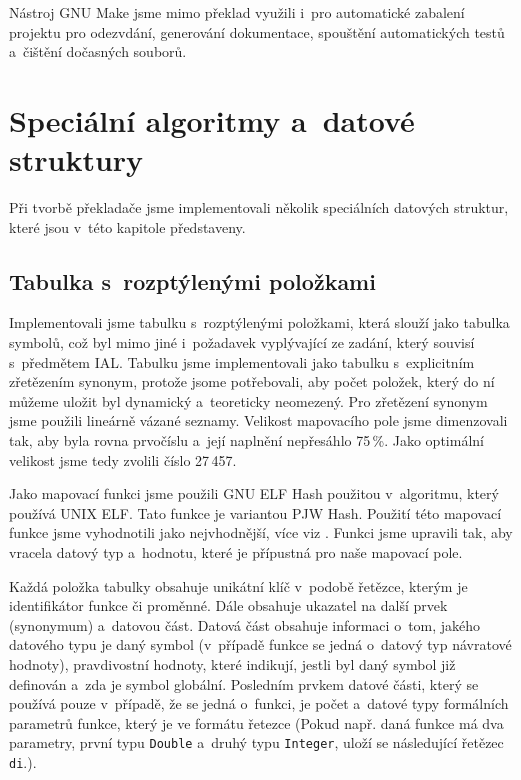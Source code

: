 \documentclass[a4paper, 11pt]{article}
\begin{document}
	Nástroj GNU Make jsme mimo překlad využili i~pro automatické zabalení projektu pro odezvdání, generování dokumentace,
	spouštění automatických testů a~čištění dočasných souborů.


	\section{Speciální algoritmy a~datové struktury}

	Při tvorbě překladače jsme implementovali několik speciálních datových struktur,
	které jsou v~této kapitole představeny.


	\subsection{Tabulka s~rozptýlenými položkami}

	Implementovali jsme tabulku s~rozptýlenými položkami, která slouží jako tabulka symbolů, což byl mimo
	jiné i~požadavek vyplývající ze zadání, který souvisí s~předmětem IAL. Tabulku jsme implementovali
	jako tabulku s~explicitním zřetězením synonym, protože jsome potřebovali, aby počet položek,
	který do ní můžeme uložit byl dynamický a~teoreticky neomezený. Pro zřetězení synonym jsme použili
	lineárně vázané seznamy. Velikost mapovacího pole jsme dimenzovali tak, aby byla rovna prvočíslu a~její
	naplnění nepřesáhlo 75\,\%. Jako optimální velikost jsme tedy zvolili číslo 27\,457.

	Jako mapovací funkci jsme použili GNU ELF Hash použitou v~algoritmu, který používá UNIX ELF.
	Tato funkce je variantou PJW Hash. Použití této mapovací funkce jsme vyhodnotili jako nejvhodnější,
	více viz \cite{PJWHashFunction2017}. Funkci jsme upravili tak, aby vracela datový typ a~hodnotu,
	které je přípustná pro naše mapovací pole.

	Každá položka tabulky obsahuje unikátní klíč v~podobě řetězce, kterým je identifikátor funkce
	či proměnné. Dále obsahuje ukazatel na další prvek (synonymum) a~datovou část. Datová část obsahuje
	informaci o~tom, jakého datového typu je daný symbol (v~případě funkce se jedná o~datový typ
	návratové hodnoty), pravdivostní hodnoty, které indikují, jestli byl daný symbol již definován
	a~zda je symbol globální. Posledním prvkem datové části, který se používá pouze v~případě, že se
	jedná o~funkci, je počet a~datové typy formálních parametrů funkce, který je ve formátu řetezce
	(Pokud např. daná funkce má dva parametry, první typu \texttt{Double} a~druhý typu \texttt{Integer},
	uloží se následující řetězec \texttt{di}.).
\end{document}
